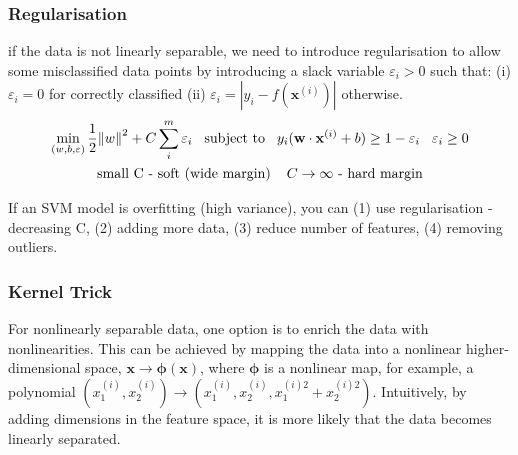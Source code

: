 \documentclass[a4paper,10pt]{article}
\begin{document}
\subsubsection{Regularisation}
if the data is not linearly separable, we need to introduce regularisation to allow some misclassified data points by introducing a slack variable $\varepsilon_i>0$ such that: (i) $\varepsilon_i=0$ for correctly classified (ii) $\varepsilon_i=\left| y_i-f(\mathbf{x}^{(i)})\right|$ otherwise. 
\begin{gather*}
    \min\limits_{(w,b,\varepsilon)}\frac{1}{2}{\lVert w \rVert}^2+C\sum_{i}^{m}\varepsilon_i\hspace*{0.3cm}\text{subject to}\hspace*{0.3cm}y_i(\mathbf{w}\cdot\mathbf{x}^{(i)}+b)\geq1-\varepsilon_i\hspace*{0.3cm}\varepsilon_i\geq0\\
    \text{small C - soft (wide margin)}\hspace*{0.4cm}C\rightarrow\infty\text{ - hard margin}
\end{gather*}

\par
If an SVM model is overfitting (high variance), you can (1) 
use regularisation - decreasing C, (2) adding more data, (3) reduce number of features, (4) removing outliers.

\subsubsection{Kernel Trick}
For nonlinearly separable data, one option is to enrich the data with nonlinearities. This can be achieved by mapping the data into a nonlinear higher-dimensional space, $\mathbf{x}\rightarrow\mathbf{\phi(x)}$, where $\mathbf{\phi}$ is a nonlinear map, for example, a polynomial $(x_1^{(i)},x_2^{(i)})\rightarrow(x_1^{(i)},x_2^{(i)},x_1^{(i)2}+x_2^{(i)2})$. Intuitively, by adding dimensions in the feature space, it is more likely that the data becomes linearly separated.\par 
\end{document}

